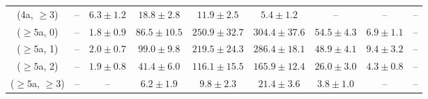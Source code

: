 \begin{table}[h!]
{\begin{tabular}{ccccccccc}
	(4a, $\ge3$) & -- & $6.3\pm 1.2$ & $18.8\pm 2.8$ & $11.9\pm 2.5$ & $5.4\pm 1.2$ & -- & -- & -- \\[0.5ex] 
	($\ge5$a, 0) & -- & $1.8\pm 0.9$ & $86.5\pm 10.5$ & $250.9\pm 32.7$ & $304.4\pm 37.6$ & $54.5\pm 4.3$ & $6.9\pm 1.1$ & -- \\[0.5ex] 
	($\ge5$a, 1) & -- & $2.0\pm 0.7$ & $99.0\pm 9.8$ & $219.5\pm 24.3$ & $286.4\pm 18.1$ & $48.9\pm 4.1$ & $9.4\pm 3.2$ & -- \\[0.5ex] 
	($\ge5$a, 2) & -- & $1.9\pm 0.8$ & $41.4\pm 6.0$ & $116.1\pm 15.5$ & $165.9\pm 12.4$ & $26.0\pm 3.0$ & $4.3\pm 0.8$ & -- \\[0.5ex] 
	($\ge5$a, $\ge3$) & -- & -- & $6.2\pm 1.9$ & $9.8\pm 2.3$ & $21.4\pm 3.6$ & $3.8\pm 1.0$ & -- & -- \\[0.5ex] 
	\hline
	\hline
\end{tabular}}
\end{table}

